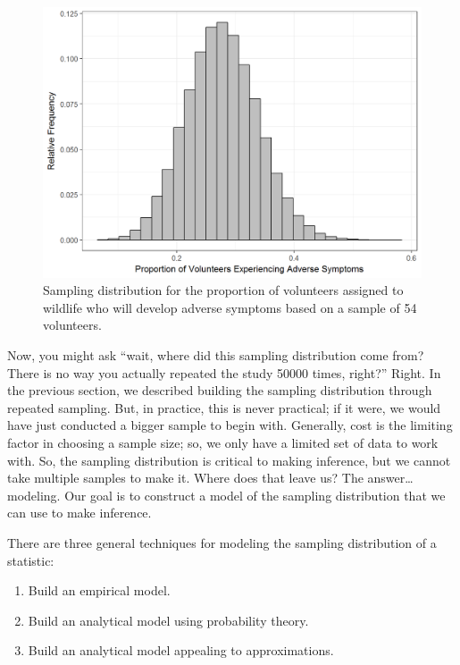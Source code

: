 \documentclass[]{book}
\providecommand{\tightlist}{%
  \setlength{\itemsep}{0pt}\setlength{\parskip}{0pt}}
\theoremstyle{definition}
\theoremstyle{definition}
\theoremstyle{remark}
\begin{document}
\begin{figure}

{\centering \includegraphics[width=0.8\linewidth]{./Images/samplingdistns-deepwater-histogram-1} 

}

\caption{Sampling distribution for the proportion of volunteers assigned to wildlife who will develop adverse symptoms based on a sample of 54 volunteers.}\label{fig:samplingdistns-deepwater-histogram}
\end{figure}

Now, you might ask ``wait, where did this sampling distribution come
from? There is no way you actually repeated the study 50000 times,
right?'' Right. In the previous section, we described building the
sampling distribution through repeated sampling. But, in practice, this
is never practical; if it were, we would have just conducted a bigger
sample to begin with. Generally, cost is the limiting factor in choosing
a sample size; so, we only have a limited set of data to work with. So,
the sampling distribution is critical to making inference, but we cannot
take multiple samples to make it. Where does that leave us? The
answer\ldots{}modeling. Our goal is to construct a model of the sampling
distribution that we can use to make inference.

There are three general techniques for modeling the sampling
distribution of a statistic:

\begin{enumerate}
\def\labelenumi{\arabic{enumi}.}
\tightlist
\item
  Build an empirical model.
\item
  Build an analytical model using probability theory.
\item
  Build an analytical model appealing to approximations.
\end{enumerate}
\end{document}
